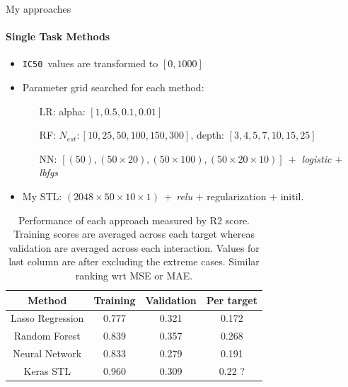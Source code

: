 \documentclass[11pt]{beamer}
\newcommand{\icfifty}{\texttt{IC50}}
\begin{document}
\begin{frame}{My approaches}
\framesubtitle{Single Task Methods}
\begin{itemize}
	\item \icfifty \ values are transformed to $[0,1000]$ %
	\item Parameter grid searched for each method:
	\begin{itemize}
	  \item[LR:] alpha: $[1, 0.5, 0.1, 0.01]$
	  \item[RF:] $N_{est}:[10,25,50,100,150,300]$, depth: $[3,4,5,7,10,15,25]$
	  \item[NN:] $[(50),(50\times20),(50\times100),(50\times20\times10)] \ +$ \textit{logistic $+$ lbfgs}
	\end{itemize}
	\item My STL: $(2048 \times 50 \times 10 \times 1) \ + \ $\textit{relu} $+$ regularization $+$ initil.
\end{itemize}
\pause
\begin{table}

\begin{tabular}{c|c|c|c}
	Method & Training & Validation & Per target \\
	\hline
	\color{green}Lasso Regression &  0.777 & 0.321 & 0.172\\
	\color{blue}Random Forest & 0.839 & 0.357 & 0.268\\
	\color{red}Neural Network & 0.833  & 0.279 & 0.191\\
	Keras STL &  0.960 &  0.309 & 0.22 ?
\end{tabular}
\caption{Performance of each approach measured by R2 score. Training scores are averaged across each target whereas validation are averaged across each interaction. Values for last column are after excluding the extreme cases. Similar ranking wrt MSE or MAE. }
\end{table}


\end{frame}
\end{document}

